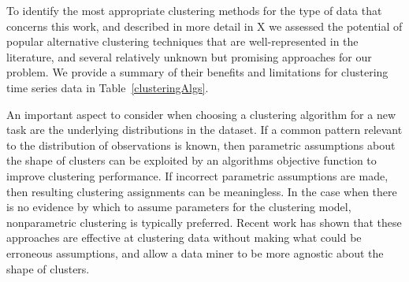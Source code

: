 To identify the most appropriate clustering methods for the type of data that concerns this work, and described in more detail in X we assessed the potential of popular alternative clustering techniques that are well-represented in the literature, and several relatively unknown but promising approaches for our problem. We provide a summary of their benefits and limitations for clustering time series data in Table~\ref{clusteringAlgs}.






An important aspect to consider when choosing a clustering algorithm for a new task are the underlying distributions in the dataset.  If a common pattern relevant to the distribution of observations is known, then parametric assumptions about the shape of clusters can be exploited by an algorithms objective function to improve clustering performance.  If incorrect parametric assumptions are made, then resulting clustering assignments can be meaningless.  In the case when there is no evidence by which to assume parameters for the clustering model, nonparametric clustering is typically preferred.  Recent work has shown that these approaches are effective at clustering data without making what could be erroneous assumptions, and allow a data miner to be more agnostic about the shape of clusters.

